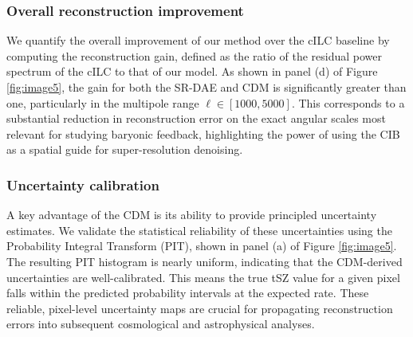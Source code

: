 \documentclass[]{article}
\begin{document}
\subsubsection{Overall reconstruction improvement}
We quantify the overall improvement of our method over the cILC baseline by computing the reconstruction gain, defined as the ratio of the residual power spectrum of the cILC to that of our model. As shown in panel (d) of Figure \ref{fig:image5}, the gain for both the SR-DAE and CDM is significantly greater than one, particularly in the multipole range $\ell \in [1000, 5000]$. This corresponds to a substantial reduction in reconstruction error on the exact angular scales most relevant for studying baryonic feedback, highlighting the power of using the CIB as a spatial guide for super-resolution denoising.

\subsubsection{Uncertainty calibration}
A key advantage of the CDM is its ability to provide principled uncertainty estimates. We validate the statistical reliability of these uncertainties using the Probability Integral Transform (PIT), shown in panel (a) of Figure \ref{fig:image5}. The resulting PIT histogram is nearly uniform, indicating that the CDM-derived uncertainties are well-calibrated. This means the true tSZ value for a given pixel falls within the predicted probability intervals at the expected rate. These reliable, pixel-level uncertainty maps are crucial for propagating reconstruction errors into subsequent cosmological and astrophysical analyses.
\end{document}

